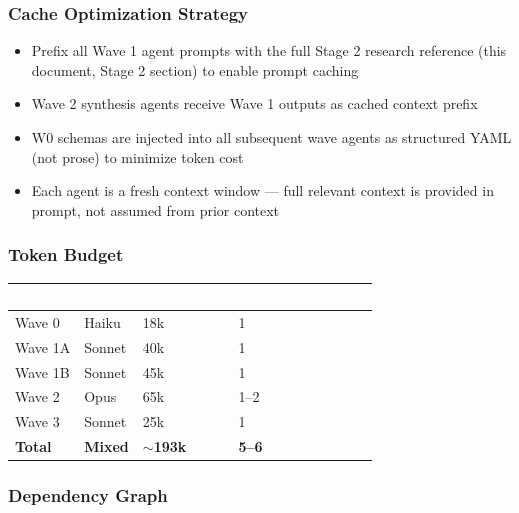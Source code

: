 \documentclass[11pt,letterpaper]{article}
\newcommand{\tableheader}[1]{\textbf{\sffamily\textcolor{white}{#1}}}
\begin{document}
\subsubsection{Cache Optimization Strategy}

\begin{itemize}[leftmargin=*]
  \item Prefix all Wave 1 agent prompts with the full Stage 2 research reference (this document, Stage 2 section) to enable prompt caching
  \item Wave 2 synthesis agents receive Wave 1 outputs as cached context prefix
  \item W0 schemas are injected into all subsequent wave agents as structured YAML (not prose) to minimize token cost
  \item Each agent is a fresh context window --- full relevant context is provided in prompt, not assumed from prior context
\end{itemize}

\subsubsection{Token Budget}

\begin{center}
\begin{tabularx}{\textwidth}{L{3cm}C{2.5cm}C{2.5cm}C{2.5cm}}
\toprule
{}
\tableheader{Wave} & \tableheader{Model} & \tableheader{Est. Tokens} & \tableheader{Context Windows} \\
\midrule
Wave 0 & Haiku & 18k & 1 \\
Wave 1A & Sonnet & 40k & 1 \\
Wave 1B & Sonnet & 45k & 1 \\
Wave 2 & Opus & 65k & 1--2 \\
Wave 3 & Sonnet & 25k & 1 \\
\midrule
\textbf{Total} & \textbf{Mixed} & \textbf{$\sim$193k} & \textbf{5--6} \\
\bottomrule
\end{tabularx}
\end{center}

\subsubsection{Dependency Graph}
\end{document}
